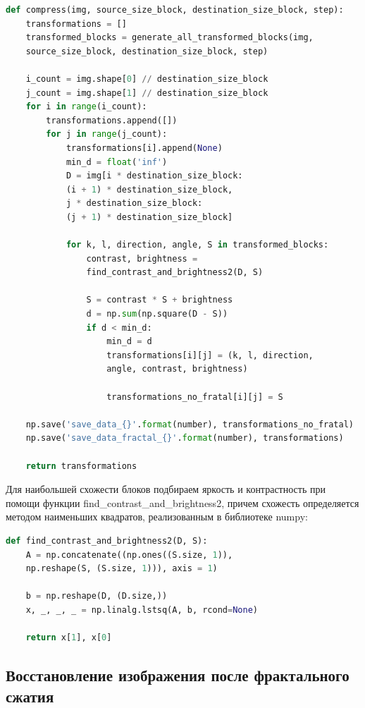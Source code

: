 \documentclass{article}
\begin{document}
\begin{lstlisting}[language=Python]
def compress(img, source_size_block, destination_size_block, step):
	transformations = []
	transformed_blocks = generate_all_transformed_blocks(img, 
	source_size_block, destination_size_block, step)
	
	i_count = img.shape[0] // destination_size_block
	j_count = img.shape[1] // destination_size_block
	for i in range(i_count):
		transformations.append([])
		for j in range(j_count):
			transformations[i].append(None)
			min_d = float('inf')
			D = img[i * destination_size_block:
			(i + 1) * destination_size_block, 
			j * destination_size_block:
			(j + 1) * destination_size_block]
			
			for k, l, direction, angle, S in transformed_blocks:
				contrast, brightness = 
				find_contrast_and_brightness2(D, S)
				
				S = contrast * S + brightness
				d = np.sum(np.square(D - S))
				if d < min_d:
					min_d = d
					transformations[i][j] = (k, l, direction, 
					angle, contrast, brightness)
					
					transformations_no_fratal[i][j] = S

	np.save('save_data_{}'.format(number), transformations_no_fratal)
	np.save('save_data_fractal_{}'.format(number), transformations)

	return transformations
\end{lstlisting}
\vspace{1em}

Для наибольшей схожести блоков подбираем яркость и контрастность при помощи функции find\_contrast\_and\_brightness2, причем схожесть определяется методом наименьших квадратов, реализованным в библиотеке numpy:
\begin{lstlisting}[language=Python]
def find_contrast_and_brightness2(D, S):
	A = np.concatenate((np.ones((S.size, 1)), 
	np.reshape(S, (S.size, 1))), axis = 1)
	
	b = np.reshape(D, (D.size,))
	x, _, _, _ = np.linalg.lstsq(A, b, rcond=None)

	return x[1], x[0]
\end{lstlisting}

\vspace{1em}

\subsection{Восстановление изображения после фрактального сжатия}
\end{document}
